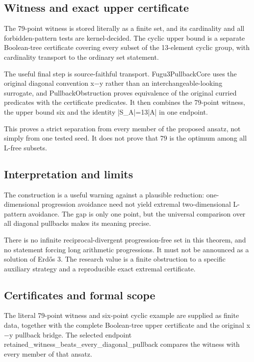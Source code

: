 \documentclass[11pt,a4paper]{article}
\begin{document}
\subsection{Witness and exact upper certificate}
The 79-point witness is stored literally as a finite set, and its cardinality and all forbidden-pattern tests are kernel-decided. The cyclic upper bound is a separate Boolean-tree certificate covering every subset of the 13-element cyclic group, with cardinality transport to the ordinary set statement.

The useful final step is source-faithful transport. Fugu3PullbackCore uses the original diagonal convention x\ensuremath{-}y rather than an interchangeable-looking surrogate, and PullbackObstruction proves equivalence of the original curried predicates with the certificate predicates. It then combines the 79-point witness, the upper bound six and the identity |S\_A|=13|A| in one endpoint.

This proves a strict separation from every member of the proposed ansatz, not simply from one tested seed. It does not prove that 79 is the optimum among all L-free subsets.

\subsection{Interpretation and limits}
The construction is a useful warning against a plausible reduction: one-dimensional progression avoidance need not yield extremal two-dimensional L-pattern avoidance. The gap is only one point, but the universal comparison over all diagonal pullbacks makes its meaning precise.

There is no infinite reciprocal-divergent progression-free set in this theorem, and no statement forcing long arithmetic progressions. It must not be announced as a solution of Erdős 3. The research value is a finite obstruction to a specific auxiliary strategy and a reproducible exact extremal certificate.

\subsection{Certificates and formal scope}
The literal 79-point witness and six-point cyclic example are supplied as finite data, together with the complete Boolean-tree upper certificate and the original x\ensuremath{-}y pullback bridge. The selected endpoint retained\_witness\_beats\_every\_diagonal\_pullback compares the witness with every member of that ansatz.
\end{document}
